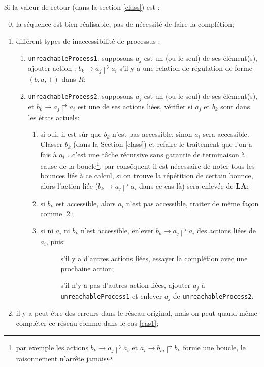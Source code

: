 \documentclass[11pt]{report}
\theoremstyle{definition}
\newcommand{\ac}[3]{$#1\to#2\Rsh#3$}
\begin{document}
Si la valeur de retour (dans la section \ref{class}) est :
\begin{enumerate}\setcounter{enumi}{-1}
	\item la s\'equence est bien r\'ealisable, pas de n\'ecessit\'e de faire la compl\'etion;
	\item  diff\'erent types de inaccessibilit\'e de processus :\label{cas1}
	\begin{enumerate}[label=\Roman*,align=left]
		\item \texttt{unreachableProcess1}: supposons $a_j$ est un (ou le seul) de ses \'el\'ement(s), ajouter action : 				$b_k\rightarrow a_j\Rsh a_i$ s'il y a une relation de r\'egulation de forme $(b,a,\pm)$ dans $R$;		
		\item \texttt{unreachableProcess2}: supposons $a_j$ est un (ou le seul) de ses \'el\'ement(s), et $b_k\rightarrow a_j\Rsh a_i$ est une de ses actions li\'ees, v\'erifier si $a_j$ et $b_k$ sont dans les \'etats actuels:
		\begin{enumerate}[label=\roman*,align=left]
			\item si oui, il est s\^ur que $b_k$ n'est pas accessible, sinon $a_i$ sera accessible. Classer $b_k$ (dans la  Section \ref{class}) et refaire le traitement que l'on a fais \`a $a_i$ \ldots c'est une t\^ache r\'ecursive sans garantie de terminaison \`a cause de la boucle\footnote{par exemple les actions \ac{b_k}{a_j}{a_i} et \ac{a_i}{b_m}{b_k} forme une boucle, le raisonnement n'arr\^ete jamais}, par cons\'equent il est n\'ecessaire de noter tous les bounces li\'es \`a ce calcul, si on trouve la r\'ep\'etition de certain bounce, alors l'action li\'ee (\ac{b_k}{a_j}{a_i} dans ce cas-l\`a) sera enlev\'ee de $\mathbf{LA}$;
			\item si $b_k$ est accessible, alors $a_i$ n'est pas accessible, traiter de m\^eme fa\c con comme \ref{2};
			\item si ni $a_i$ ni $b_k$ n'est accessible, enlever $b_k\rightarrow a_j\Rsh a_i$ des actions li\'ees de $a_i$, puis:
			\begin{description}
				\item[\quad] s'il y a d'autres actions li\'ees, essayer la compl\'etion avec une prochaine action;
				\item[\quad] s'il n'y a pas d'autres action li\'ees, ajouter $a_j$ \`a \texttt{unreachableProcess1} et enlever $a_j$ de \texttt{unreachableProcess2}.
			\end{description}
		\end{enumerate}
	\end{enumerate}
\item il y a peut-\^etre des erreurs dans le r\'eseau original, mais on peut quand m\^eme compl\'eter ce r\'eseau comme dans le cas \ref{cas1};
\end{enumerate}
\end{document}
